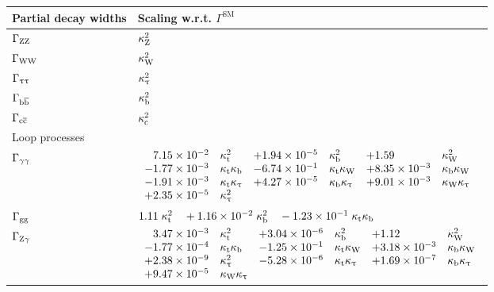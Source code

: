 \begin{table}[htb]
    \centering
    \label{tab:decaywidths}
    \setlength{\tabcolsep}{5pt}
    \begin{tabular}{ll}
    Partial decay widths         & Scaling w.r.t. $\Gamma^\text{SM}$  \\[\tablelineskip]
    \hline
    $\Gamma_{\mathrm{Z}\mathrm{Z}}$       & $\kappa_{\mathrm{Z}}^2$ \\[3pt]
    $\Gamma_{\mathrm{W}\mathrm{W}}$       & $\kappa_{\mathrm{W}}^2$ \\[3pt]
    $\Gamma_{\uptau\uptau}$ & $\kappa_{\uptau}^2 $ \\[3pt]
    $\Gamma_{\mathrm{b}\overline{\mathrm{b}}}$               & $\kappa_{\mathrm{b}}^2$ \\[3pt]
    $\Gamma_{\mathrm{c}\overline{\mathrm{c}}}$               & $\kappa_{\mathrm{c}}^2$ \\[12pt]
    Loop processes & \\[\tablelineskip]
    \hline
    $\Gamma_{\mathrm{\gamma}\mathrm{\gamma}}$       & $\begin{array}{llllll}
        \hphantom{+}7.15 \times 10^{-2}      & \kappa_{\mathrm{t}}^2
        & + 1.94 \times 10^{-5}  & \kappa_{\mathrm{b}}^2
        & + 1.59                 & \kappa_{\mathrm{W}}^2
        \\
        - 1.77 \times 10^{-3}    & \kappa_{\mathrm{t}}\kappa_{\mathrm{b}}
        & - 6.74 \times 10^{-1}  & \kappa_{\mathrm{t}}\kappa_{\mathrm{W}}
        & + 8.35 \times 10^{-3}  & \kappa_{\mathrm{b}}\kappa_{\mathrm{W}}
        \\
        - 1.91 \times 10^{-3}    & \kappa_{\mathrm{t}}\kappa_{\uptau}
        & + 4.27 \times 10^{-5}  & \kappa_{\mathrm{b}}\kappa_{\uptau}
        & + 9.01 \times 10^{-3}  & \kappa_{\mathrm{W}}\kappa_{\uptau}
        \\
        + 2.35 \times 10^{-5}    & \kappa_{\uptau}^2
        &                        &
        &                        &
        \end{array}$
    \\[24pt]
    $\Gamma_{\mathrm{g}\mathrm{g}}$        & $%
        1.11 \;\kappat^2  \quad+  1.16 \times 10^{-2} \;\kappab^2  \quad-  1.23 \times 10^{-1} \;\kappat\kappab %
        $
    \\[10pt]
    $\Gamma_{\mathrm{Z}\mathrm{\gamma}}$        & $\begin{array}{llllll}
        \hphantom{+}3.47 \times 10^{-3}  & \kappa_{\mathrm{t}}^2
        & +3.04 \times 10^{-6} & \kappa_{\mathrm{b}}^2
        & +1.12                & \kappa_{\mathrm{W}}^2
        \\
          -1.77 \times 10^{-4} & \kappa_{\mathrm{t}}\kappa_{\mathrm{b}}
        & -1.25 \times 10^{-1} & \kappa_{\mathrm{t}}\kappa_{\mathrm{W}}
        & +3.18 \times 10^{-3} & \kappa_{\mathrm{b}}\kappa_{\mathrm{W}}
        \\
          +2.38 \times 10^{-9} & \kappa_{\uptau}^2
        & -5.28 \times 10^{-6} & \kappa_{\mathrm{t}}\kappa_{\uptau}
        & +1.69 \times 10^{-7} & \kappa_{\mathrm{b}}\kappa_{\uptau}
        \\
          +9.47 \times 10^{-5} & \kappa_{\mathrm{W}}\kappa_{\uptau}
        &                      &
        &                      &
        \end{array}$
    \end{tabular}
    \end{table}
